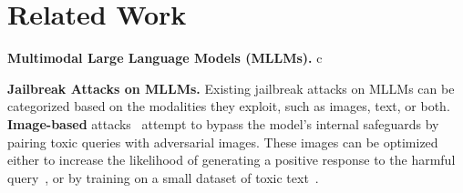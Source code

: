 \section{Related Work}\label{sec:related_work}
\textbf{Multimodal Large Language Models (MLLMs).}
c

\textbf{Jailbreak Attacks on MLLMs.} 
Existing jailbreak attacks on MLLMs can be categorized based on the modalities they exploit, such as images, text, or both.
\textbf{Image-based} attacks~\citep{niu2024jailbreaking,qi2024visual} attempt to bypass the model's internal safeguards by pairing toxic queries with adversarial images. These images can be optimized either to increase the likelihood of generating a positive response to the harmful query~\citep{niu2024jailbreaking}, or by training on a small dataset of toxic text~\citep{qi2024visual}.
